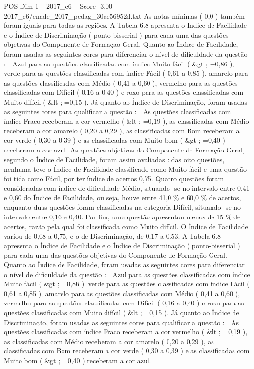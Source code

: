 \begin{textsample}{POS Dim 1 – 2017\_c6 – Score -3.00 – 2017\_c6/enade\_2017\_pedag\_30ae56952d.txt}
As notas mínimas ( 0,0 ) também foram iguais para todas as regiões.
A Tabela 6.8 apresenta o Índice de Facilidade e o Índice de Discriminação ( ponto-bisserial ) para cada uma das questões objetivas do Componente de Formação Geral.
Quanto ao Índice de Facilidade, foram usadas as seguintes cores para diferenciar o nível de dificuldade da questão :  Azul para as questões classificadas com índice Muito fácil ( \&gt ; =0,86 ), verde para as questões classificadas com índice Fácil ( 0,61 a 0,85 ), amarelo para as questões classificadas com Médio ( 0,41 a 0,60 ), vermelho para as questões classificadas com Difícil ( 0,16 a 0,40 ) e roxo para as questões classificadas com Muito difícil ( \&lt ; =0,15 ).
Já quanto ao Índice de Discriminação, foram usadas as seguintes cores para qualificar a questão :  As questões classificadas com índice Fraco receberam a cor vermelho ( \&lt ; =0,19 ), as classificadas com Médio receberam a cor amarelo ( 0,20 a 0,29 ), as classificadas com Bom receberam a cor verde ( 0,30 a 0,39 ) e as classificadas com Muito bom ( \&gt ; =0,40 ) receberam a cor azul.
As questões objetivas do Componente de Formação Geral, segundo o Índice de Facilidade, foram assim avaliadas : das oito questões, nenhuma teve o Índice de Facilidade classificado como Muito fácil e uma questão foi tida como Fácil, por ter índice de acertos 0,75.
Quatro questões foram consideradas com índice de dificuldade Médio, situando -se no intervalo entre 0,41 e 0,60 do Índice de Facilidade, ou seja, houve entre 41,0 \% e 60,0 \% de acertos, enquanto duas questões foram classificadas na categoria Difícil, situando -se no intervalo entre 0,16 e 0,40.
Por fim, uma questão apresentou menos de 15 \% de acertos, razão pela qual foi classificada como Muito difícil.
O Índice de Facilidade variou de 0,08 a 0,75, e o de Discriminação, de 0,17 a 0,53.
A Tabela 6.8 apresenta o Índice de Facilidade e o Índice de Discriminação ( ponto-bisserial ) para cada uma das questões objetivas do Componente de Formação Geral.
Quanto ao Índice de Facilidade, foram usadas as seguintes cores para diferenciar o nível de dificuldade da questão :  Azul para as questões classificadas com índice Muito fácil ( \&gt ; =0,86 ), verde para as questões classificadas com índice Fácil ( 0,61 a 0,85 ), amarelo para as questões classificadas com Médio ( 0,41 a 0,60 ), vermelho para as questões classificadas com Difícil ( 0,16 a 0,40 ) e roxo para as questões classificadas com Muito difícil ( \&lt ; =0,15 ).
Já quanto ao Índice de Discriminação, foram usadas as seguintes cores para qualificar a questão :  As questões classificadas com índice Fraco receberam a cor vermelho ( \&lt ; =0,19 ), as classificadas com Médio receberam a cor amarelo ( 0,20 a 0,29 ), as classificadas com Bom receberam a cor verde ( 0,30 a 0,39 ) e as classificadas com Muito bom ( \&gt ; =0,40 ) receberam a cor azul.

\end{textsample}
